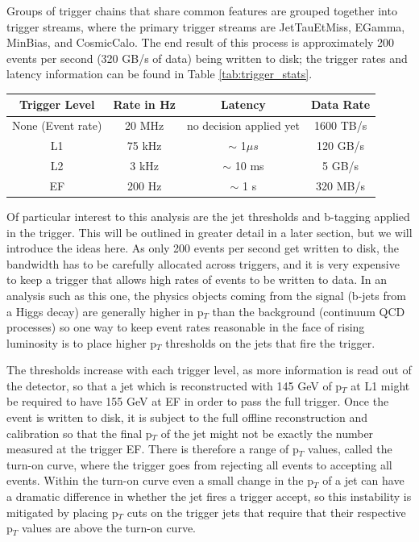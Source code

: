 Groups of trigger chains that share common features are grouped together into trigger streams, where the primary trigger streams are JetTauEtMiss, EGamma, MinBias, and CosmicCalo.  The end result of this process is approximately 200 events per second (320 GB/s of data) being written to disk; the trigger rates and latency information can be found in Table \ref{tab:trigger_stats}.

  

\begin{table}
\begin{tabular}{c | c | c | c}
Trigger Level & Rate in Hz  & Latency  & Data Rate\\  \hline
None (Event rate) & 20 MHz  & no decision applied yet & 1600 TB/s \\
L1  & 75 kHz  &  $\sim$ 1$\mu s$  & 120 GB/s\\
L2  & 3 kHz    & $\sim$ 10 ms & 5 GB/s \\
EF  &  200 Hz  & $\sim$ 1 s & 320 MB/s \\
\end{tabular}
\end{table}
\label{tab:trigger_stats}


Of particular interest to this analysis are the jet thresholds and b-tagging applied in the trigger.  This will be outlined in greater detail in a later section, but we will introduce the ideas here.  As only 200 events per second get written to disk, the bandwidth has to be carefully allocated across triggers, and it is very expensive to keep a trigger that allows high rates of events to be written to data.  In an analysis such as this one, the physics objects coming from the signal (b-jets from a Higgs decay) are generally higher in p$_T$ than the background (continuum QCD processes) so one way to keep event rates reasonable in the face of rising luminosity is to place higher p$_T$ thresholds on the jets that fire the trigger.   

The thresholds increase with each trigger level, as more information is read out of the detector, so that a jet which is reconstructed with 145 GeV of p$_T$ at L1 might be required to have 155 GeV at EF in order to pass the full trigger.  Once the event is written to disk, it is subject to the full offline reconstruction and calibration so that the final p$_T$ of the jet might not be exactly the number measured at the trigger EF.  There is therefore a range of p$_T$ values, called the turn-on curve, where the trigger goes from rejecting all events to accepting all events.  Within the turn-on curve even a small change in the p$_T$ of a jet can have a dramatic difference in whether the jet fires a trigger accept, so this instability is mitigated by placing p$_T$ cuts on the trigger jets that require that their respective p$_T$ values are above the turn-on curve.  

